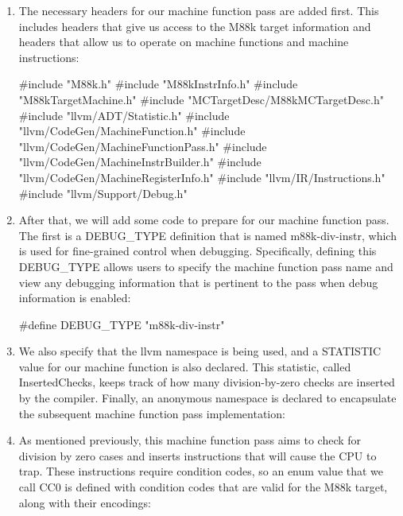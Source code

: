 \begin{enumerate}
\item
The necessary headers for our machine function pass are added first. This includes headers that give us access to the M88k target information and headers that allow us to operate on machine functions and machine instructions:

\begin{cpp}
#include "M88k.h"
#include "M88kInstrInfo.h"
#include "M88kTargetMachine.h"
#include "MCTargetDesc/M88kMCTargetDesc.h"
#include "llvm/ADT/Statistic.h"
#include "llvm/CodeGen/MachineFunction.h"
#include "llvm/CodeGen/MachineFunctionPass.h"
#include "llvm/CodeGen/MachineInstrBuilder.h"
#include "llvm/CodeGen/MachineRegisterInfo.h"
#include "llvm/IR/Instructions.h"
#include "llvm/Support/Debug.h"
\end{cpp}

\item
After that, we will add some code to prepare for our machine function pass. The first is a DEBUG\_TYPE definition that is named m88k-div-instr, which is used for fine-grained control when debugging. Specifically, defining this DEBUG\_TYPE allows users to specify the machine function pass name and view any debugging information that is pertinent to the pass when debug information is enabled:

\begin{cpp}
#define DEBUG_TYPE "m88k-div-instr"
\end{cpp}

\item
We also specify that the llvm namespace is being used, and a STATISTIC value for our machine function is also declared. This statistic, called InsertedChecks, keeps track of how many division-by-zero checks are inserted by the compiler. Finally, an anonymous namespace is declared to encapsulate the subsequent machine function pass implementation:

\begin{cpp}
using namespace llvm;
STATISTIC(InsertedChecks, "Number of inserted checks for
division by zero");
namespace {
\end{cpp}

\item
As mentioned previously, this machine function pass aims to check for division by zero cases and inserts instructions that will cause the CPU to trap. These instructions require condition codes, so an enum value that we call CC0 is defined with condition codes that are valid for the M88k target, along with their encodings:


\end{enumerate}
